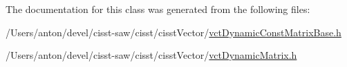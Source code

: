 The documentation for this class was generated from the following files\+:\begin{DoxyCompactItemize}
\item 
/\+Users/anton/devel/cisst-\/saw/cisst/cisst\+Vector/\hyperlink{vct_dynamic_const_matrix_base_8h}{vct\+Dynamic\+Const\+Matrix\+Base.\+h}\item 
/\+Users/anton/devel/cisst-\/saw/cisst/cisst\+Vector/\hyperlink{vct_dynamic_matrix_8h}{vct\+Dynamic\+Matrix.\+h}\end{DoxyCompactItemize}
